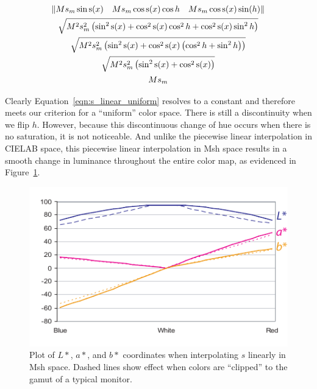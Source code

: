 \documentclass{acmsiggraph}               %
\newcommand{\Lab}{CIELAB\xspace}
\newcommand{\Msh}{Msh\xspace}
\begin{document}
\begin{equation}
  \begin{gathered}
    \left\lVert M s_m \sin\operatorname{s}(x) \quad
        M s_m \cos\operatorname{s}(x) \cos h \quad
        M s_m \cos\operatorname{s}(x) \sin(h) \right\rVert \\
    \sqrtsign{ M^2 s_m^2 \left( \sin^2 \operatorname{s}(x)
        + \cos^2 \operatorname{s}(x) \cos^2 h
        + \cos^2 \operatorname{s}(x) \sin^2 h \right) } \\
    \sqrtsign{ M^2 s_m^2 \left( \sin^2 \operatorname{s}(x)
        + \cos^2 \operatorname{s}(x) \left( \cos^2 h
          + \sin^2 h \right) \right) } \\
    \sqrtsign{ M^2 s_m^2 \left( \sin^2 \operatorname{s}(x)
        + \cos^2 \operatorname{s}(x) \right) } \\
    M s_m
    \label{eqn:s_linear_uniform}
  \end{gathered}
\end{equation}

Clearly Equation~\ref{eqn:s_linear_uniform} resolves to a constant and
therefore meets our criterion for a ``uniform'' color space.  There is still
a discontinuity when we flip $h$.  However, because this discontinuous
change of hue occurs when there is no saturation, it is not noticeable.
And unlike the piecewise linear interpolation in \Lab space, this piecewise
linear interpolation in \Msh space results in a smooth change in luminance
throughout the entire color map, as evidenced in Figure~\ref{fig:s_plot}.

\begin{figure}
  \centering
  \includegraphics{images/LinearMshPlot}
  \caption{Plot of $L*$, $a*$, and $b*$ coordinates when interpolating $s$
    linearly in \Msh space.  Dashed lines show effect when colors are
    ``clipped'' to the gamut of a typical monitor.}
  \label{fig:s_plot}
\end{figure}
\end{document}
